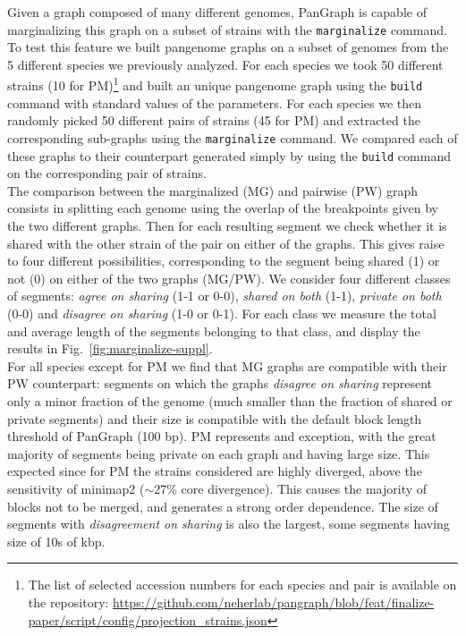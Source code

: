 \documentclass[aps,rmp,reprint,superscriptaddress,notitlepage,10pt,onecolumn]{revtex4-1}
\begin{document}
Given a graph composed of many different genomes, PanGraph is capable of marginalizing this graph on a subset of strains with the \verb|marginalize| command. To test this feature we built pangenome graphs on a subset of genomes from the 5 different species we previously analyzed. For each species we took 50 different strains (10 for PM)\footnote{The list of selected accession numbers for each species and pair is available on the repository: \url{https://github.com/neherlab/pangraph/blob/feat/finalize-paper/script/config/projection_strains.json}} and built an unique pangenome graph using the \verb|build| command with standard values of the parameters. For each species we then randomly picked 50 different pairs of strains (45 for PM) and extracted the corresponding sub-graphs using the \verb|marginalize| command. We compared each of these graphs to their counterpart generated simply by using the \verb|build| command on the corresponding pair of strains.\\
The comparison between the marginalized (MG) and pairwise (PW) graph consists in splitting each genome using the overlap of the breakpoints given by the two different graphs. Then for each resulting segment we check whether it is shared with the other strain of the pair on either of the graphs. This gives raise to four different possibilities, corresponding to the segment being shared (1) or not (0) on either of the two graphs (MG/PW). We consider four different classes of segments: \textit{agree on sharing} (1-1 or 0-0), \textit{shared on both} (1-1), \textit{private on both} (0-0) and \textit{disagree on sharing} (1-0 or 0-1). For each class we measure the total and average length of the segments belonging to that class, and display the results in Fig.~\ref{fig:marginalize-suppl}.\\
For all species except for PM we find that MG graphs are compatible with their PW counterpart: segments on which the graphs \textit{disagree on sharing} represent only a minor fraction of the genome (much smaller than the fraction of shared or private segments) and their size is compatible with the default block length threshold of PanGraph (100 bp). PM represents and exception, with the great majority of segments being private on each graph and having large size. This expected since for PM the strains considered are highly diverged, above the sensitivity of minimap2 ($\sim 27\%$ core divergence). This causes the majority of blocks not to be merged, and generates a strong order dependence. The size of segments with \textit{disagreement on sharing} is also the largest, some segments having size of 10s of kbp.
\end{document}
